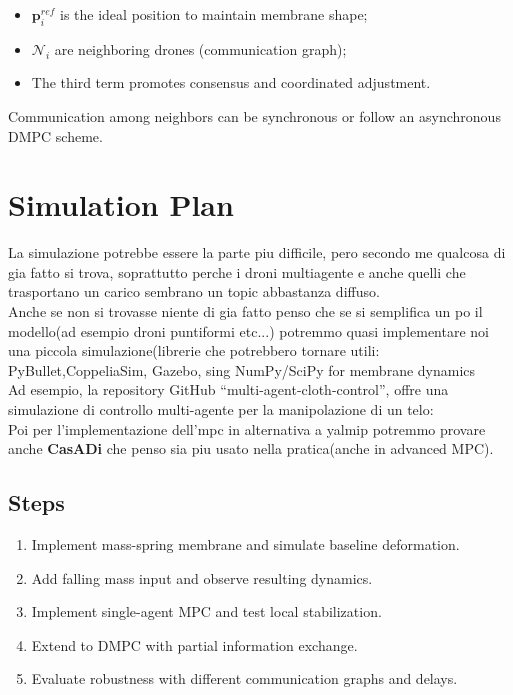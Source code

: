\documentclass[11pt]{article}
\begin{document}
\begin{itemize}
    \item $\mathbf{p}_i^{ref}$ is the ideal position to maintain membrane shape;
    \item $\mathcal{N}_i$ are neighboring drones (communication graph);
    \item The third term promotes consensus and coordinated adjustment.
\end{itemize}

Communication among neighbors can be synchronous or follow an asynchronous DMPC scheme.

\section{Simulation Plan}
La simulazione potrebbe essere la parte piu difficile, pero secondo me qualcosa di gia fatto si trova, soprattutto perche i droni multiagente e anche quelli che trasportano un carico sembrano un topic abbastanza diffuso. \\
Anche se non si trovasse niente di gia fatto penso che se si semplifica un po il modello(ad esempio droni puntiformi etc...) potremmo quasi implementare noi una piccola simulazione(librerie che potrebbero tornare utili: PyBullet,CoppeliaSim, Gazebo, sing NumPy/SciPy for membrane dynamics \\
Ad esempio, la repository GitHub “multi-agent-cloth-control”,  offre una simulazione di controllo multi-agente per la manipolazione di un telo:  \href{https://github.com/nachocz/multi-agent-cloth-control?utm_source=chatgpt.com} \\
Poi per l'implementazione dell'mpc in alternativa a yalmip potremmo provare anche \textbf{CasADi} che penso sia piu usato nella pratica(anche in advanced MPC).


\subsection*{Steps}

\begin{enumerate}
    \item Implement mass-spring membrane and simulate baseline deformation.
    \item Add falling mass input and observe resulting dynamics.
    \item Implement single-agent MPC and test local stabilization.
    \item Extend to DMPC with partial information exchange.
    \item Evaluate robustness with different communication graphs and delays.
\end{enumerate}
\end{document}
